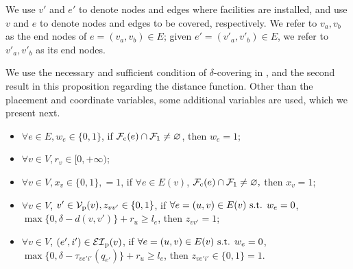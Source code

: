 We use $v'$ and $e'$ to denote nodes and edges where facilities are installed,   and use $v$ and $e$ to denote  nodes and edges to be covered, respectively. We refer to $v_a, v_b$ as the end nodes of $e=(v_a,v_b)\in E$; given $e'=(v'_a,v'_b) \in E$, we refer to $v'_a, v'_b$ as its end nodes.


We use the necessary and sufficient condition of $\delta$-covering in , and the second result in this proposition regarding the distance function. Other than the placement and coordinate variables, some additional variables are used, which we present next.


\begin{itemize}
    \item  $\forall e \in E, w_e\in\{0,1\}$, if $\mathcal F_{\mathrm{c}}(e)\cap \mathcal F_1\neq \varnothing$, then $w_e = 1$;
\item $\forall  v \in V, r_{v}\in[0, +\infty)$; 
\item $\forall v \in V, x_{v}\in\{0,1\}, =1$, if $\forall e\in E(v)$, $ \mathcal F_{\mathrm{c}}(e) \cap \mathcal F_1 \ne \varnothing,$ then $x_v = 1$;
\item $\forall  v \in V$, $v' \in \mathcal V_{\mathrm{p}}(v), z_{vv'}\in\{0,1\}$, if $ \forall e=(u,v)\in E(v)\textup{ s.t. } w_e=0$, $\max\{0,\delta-d(v,v')\}+r_u\geq l_e$, then $z_{vv'} = 1$;
\item  $\forall v \in V$, $(e',i') \in {\mathcal {EI}}_{\mathrm{p}}(v)$, if $\forall e=(u,v)\in E(v)\textup{ s.t. } w_e=0$, $\max\{0,\delta- \tau_{ve'i'}(q_{e'})\}+r_u\geq l_e$, then $ z_{ve'{i'}}\in\{0,1\}=1$.
\end{itemize}


